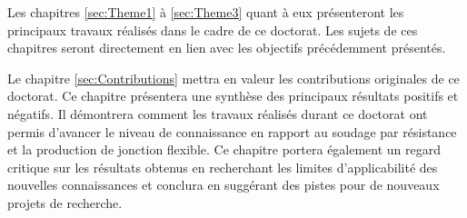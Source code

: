 Les chapitres \ref{sec:Theme1} à \ref{sec:Theme3} quant à eux présenteront les principaux travaux réalisés dans le cadre de ce doctorat. 
Les sujets de ces chapitres seront directement en lien avec les objectifs précédemment présentés. 

Le chapitre \ref{sec:Contributions} mettra en valeur les contributions originales de ce doctorat. 
Ce chapitre présentera une synthèse des principaux résultats positifs et négatifs. 
Il démontrera comment les travaux réalisés durant ce doctorat ont permis d'avancer le niveau de connaissance en rapport au soudage par résistance et la production de jonction flexible. 
Ce chapitre portera également un regard critique sur les résultats obtenus en recherchant les limites d'applicabilité des nouvelles connaissances et conclura en suggérant des pistes pour de nouveaux projets de recherche. 


